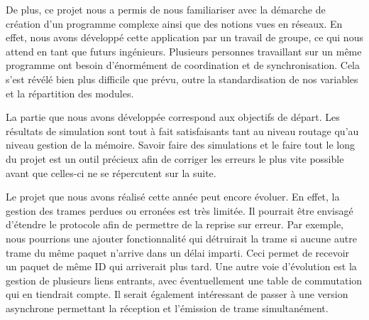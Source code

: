 \documentclass[a4paper,11pt]{article}
\begin{document}
De plus, ce projet nous a permis de nous familiariser avec la démarche de création d'un programme complexe ainsi  que des notions vues en réseaux. En effet, nous avons développé cette application par un travail de groupe, ce qui nous attend en tant que futurs ingénieurs. Plusieurs personnes travaillant sur un même programme ont besoin d'énormément de coordination et de synchronisation. Cela s'est révélé bien plus difficile que prévu, outre la standardisation de nos variables et la répartition des modules.

La partie que nous avons développée correspond aux objectifs de départ. Les résultats de simulation sont tout à fait satisfaisants tant au niveau routage qu'au niveau gestion de la mémoire. Savoir faire des simulations et le faire tout le long du projet est un outil précieux afin de corriger les erreurs le plus vite possible avant que celles-ci ne se répercutent sur la suite.

Le projet que nous avons réalisé cette année peut encore évoluer.
En effet, la gestion des trames perdues ou erronées est très limitée.
Il pourrait être envisagé d'étendre le protocole afin de permettre de la
reprise sur erreur. Par exemple, nous pourrions une ajouter fonctionnalité qui détruirait la trame si aucune autre trame du même paquet 
n'arrive dans un délai imparti. Ceci permet de recevoir un paquet de
même ID qui arriverait plus tard. Une autre voie d'évolution est la
gestion de plusieurs liens entrants, avec éventuellement une table de
commutation qui en tiendrait compte. Il serait également intéressant de
passer à une version asynchrone permettant la réception et l'émission de
trame simultanément.
\end{document}
